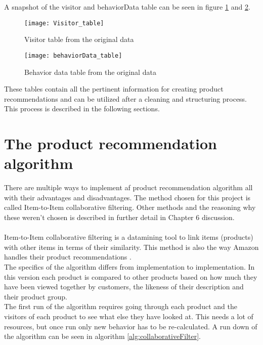 A snapshot of the visitor and behaviorData table can be seen in figure \ref{visitorTable} and \ref{behaviorTable}.

\begin{figure}[H]
\texttt{[image: Visitor\_table]}
\caption{Visitor table from the original data}
\label{visitorTable}
\end{figure}
\begin{figure}[H]
\texttt{[image: behaviorData\_table]}
\caption{Behavior data table from the original data}
\label{behaviorTable}
\end{figure}

These tables contain all the pertinent information for creating product recommendations and can be utilized after a cleaning and structuring process. This process is described in the following sections.

\section{The product recommendation algorithm}
There are multiple ways to implement af product recommendation algorithm all with their advantages and disadvantages. The method chosen for this project is called Item-to-Item collaborative filtering. Other methods and the reasoning why these weren't chosen is described in further detail in Chapter 6 discussion. \\\\

Item-to-Item collaborative filtering is a datamining tool to link items (products) with other items in terms of their similarity. This method is also the way \gls{Amazon} handles their product recommendations \cite{AmazonRecommendations}. \\
The specifics of the algorithm differs from implementation to implementation. In this version each product is compared to other products based on how much they have been viewed together by customers, the likeness of their description and their product group. \\
The first run of the algorithm requires going through each product and the visitors of each product to see what else they have looked at. This needs a lot of resources, but once run only new behavior has to be re-calculated. A run down of the algorithm can be seen in algorithm \ref{alg:collaborativeFilter}. \\\\

